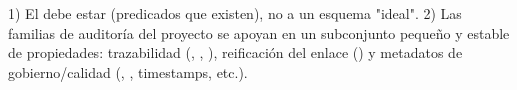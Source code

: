 {}1) El  debe estar  (predicados que existen), no a un esquema "ideal". 2) Las familias de auditoría del proyecto se apoyan en un subconjunto pequeño y estable de propiedades: trazabilidad (, , ), reificación del enlace () y metadatos de gobierno/calidad (, , timestamps, etc.).\markdownRendererInterblockSeparator
{}\markdownRendererInterblockSeparator
